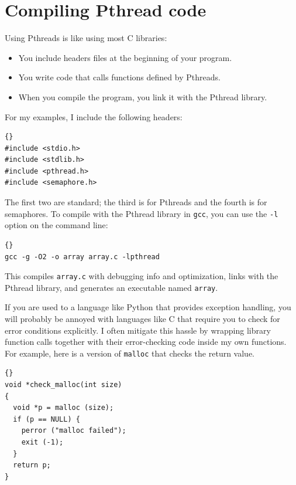 \documentclass{book}
\begin{document}
\section{Compiling Pthread code}

Using Pthreads is like using most C libraries:

\begin{itemize}

\item You include headers files at the beginning of your
program.

\item You write code that calls functions defined by Pthreads.

\item When you compile the program, you link it with the
Pthread library.

\end{itemize}

For my examples, I include the following headers:

\begin{lstlisting}[caption={Headers}]{}
#include <stdio.h>
#include <stdlib.h>
#include <pthread.h>
#include <semaphore.h>
\end{lstlisting}

The first two are standard; the third is for Pthreads and
the fourth is for semaphores.
To compile with the Pthread library in {\tt gcc}, you
can use the {\tt -l}
option on the command line:

\begin{lstlisting}[caption={}]{}
gcc -g -O2 -o array array.c -lpthread
\end{lstlisting}

This compiles {\tt array.c} with debugging info and optimization,
links with the Pthread library, and generates an executable
named {\tt array}.

If you are used to a language like Python that provides exception
handling, you will probably be annoyed with languages like C that
require you to check for error conditions explicitly.  I often
mitigate this hassle by wrapping library function calls
together with their error-checking code inside my own functions.
For example, here is a version of {\tt malloc}
that checks the return value.

\begin{lstlisting}[caption={}]{}
void *check_malloc(int size)
{
  void *p = malloc (size);
  if (p == NULL) {
    perror ("malloc failed");
    exit (-1);
  }
  return p;
}
\end{lstlisting}
\end{document}
